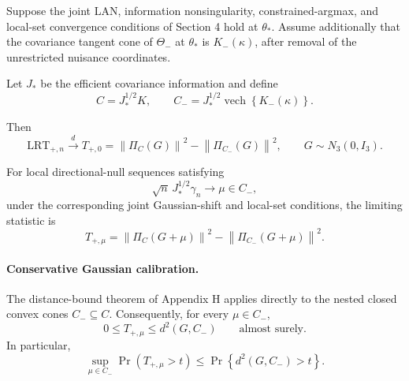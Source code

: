 \begin{proposition}
\label{prop:directional-vertex-limit}

Suppose the joint LAN, information nonsingularity,
constrained-argmax, and local-set convergence conditions
of Section 4 hold at $\theta_*$. Assume additionally
that the covariance tangent cone of $\Theta_-$ at
$\theta_*$ is $K_-(\kappa)$, after removal of the
unrestricted nuisance coordinates.

Let $J_*$ be the efficient covariance information and
define
\begin{equation*}
C
=
J_*^{1/2}K,
\qquad
C_-
=
J_*^{1/2}
\operatorname{vech}
\left\{
K_-(\kappa)
\right\}.
\end{equation*}

Then
\begin{equation}
\mathrm{LRT}_{+,n}
\xrightarrow{d}
T_{+,0}
=
\left\|
\Pi_C(G)
\right\|^2
-
\left\|
\Pi_{C_-}(G)
\right\|^2,
\qquad
G\sim N_3(0,I_3).
\label{eq:directional-vertex-limit}
\end{equation}

For local directional-null sequences satisfying
\begin{equation*}
\sqrt{n}\,
J_*^{1/2}\gamma_n
\longrightarrow
\mu\in C_-,
\end{equation*}
under the corresponding joint Gaussian-shift and
local-set conditions, the limiting statistic is
\begin{equation}
T_{+,\mu}
=
\left\|
\Pi_C(G+\mu)
\right\|^2
-
\left\|
\Pi_{C_-}(G+\mu)
\right\|^2.
\label{eq:directional-shift-limit}
\end{equation}

\end{proposition}

\paragraph{Conservative Gaussian calibration.}

The distance-bound theorem of Appendix H applies directly to the nested
closed convex cones $C_-\subseteq C$. Consequently,
for every $\mu\in C_-$,
\begin{equation}
0
\leq
T_{+,\mu}
\leq
d^2(G,C_-)
\qquad\text{almost surely}.
\label{eq:directional-distance-bound}
\end{equation}
In particular,
\begin{equation}
\sup_{\mu\in C_-}
\Pr(T_{+,\mu}>t)
\leq
\Pr
\left\{
d^2(G,C_-)>t
\right\}.
\label{eq:directional-tail-bound}
\end{equation}

